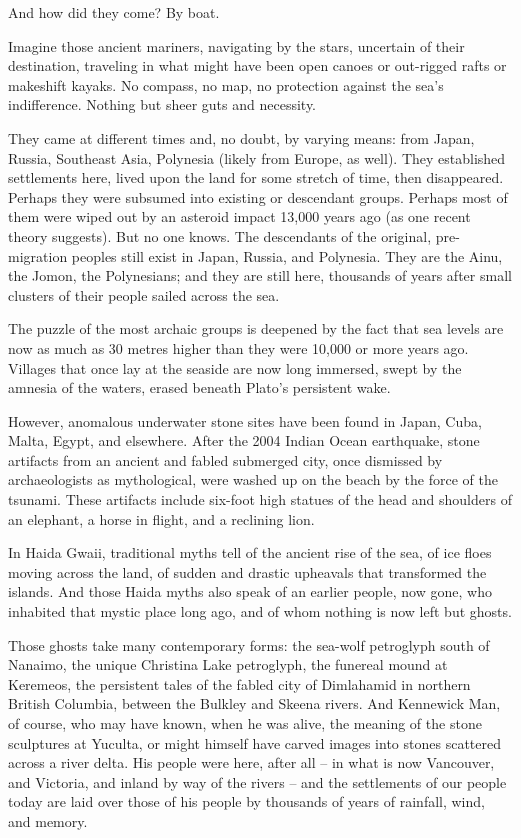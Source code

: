 \documentclass[letterpaper,10pt,headsepline]{scrreprt}
\begin{document}
And how did they come? By boat.

Imagine those ancient mariners, navigating by the stars, uncertain of
their destination, traveling in what might have been open canoes or
out-rigged rafts or makeshift kayaks. No compass, no map, no
protection against the sea's indifference. Nothing but sheer guts and
necessity.

They came at different times and, no doubt, by varying means: from
Japan, Russia, Southeast Asia, Polynesia (likely from Europe, as
well). They established settlements here, lived upon the land for some
stretch of time, then disappeared. Perhaps they were subsumed into
existing or descendant groups. Perhaps most of them were wiped out by
an asteroid impact 13,000 years ago (as one recent theory suggests).
But no one knows. The descendants of the original, pre-migration
peoples still exist in Japan, Russia, and Polynesia. They are the
Ainu, the Jomon, the Polynesians; and they are still here, thousands
of years after small clusters of their people sailed across the sea.

The puzzle of the most archaic groups is deepened by the fact that sea
levels are now as much as 30 metres higher than they were 10,000 or
more years ago. Villages that once lay at the seaside are now long
immersed, swept by the amnesia of the waters, erased beneath Plato's
persistent wake.

However, anomalous underwater stone sites have been found in Japan,
Cuba, Malta, Egypt, and elsewhere. After the 2004 Indian Ocean
earthquake, stone artifacts from an ancient and fabled submerged city,
once dismissed by archaeologists as mythological, were washed up on
the beach by the force of the tsunami. These artifacts include
six-foot high statues of the head and shoulders of an elephant, a
horse in flight, and a reclining lion.

In Haida Gwaii, traditional myths tell of the ancient rise of the sea,
of ice floes moving across the land, of sudden and drastic upheavals
that transformed the islands. And those Haida myths also speak of an
earlier people, now gone, who inhabited that mystic place long ago,
and of whom nothing is now left but ghosts.

Those ghosts take many contemporary forms: the sea-wolf petroglyph
south of Nanaimo, the unique Christina Lake petroglyph, the funereal
mound at Keremeos, the persistent tales of the fabled city of
Dimlahamid in northern British Columbia, between the Bulkley and
Skeena rivers. And Kennewick Man, of course, who may have known, when
he was alive, the meaning of the stone sculptures at Yuculta, or might
himself have carved images into stones scattered across a river delta.
His people were here, after all -- in what is now Vancouver, and
Victoria, and inland by way of the rivers -- and the settlements of
our people today are laid over those of his people by thousands of
years of rainfall, wind, and memory.
\end{document}
